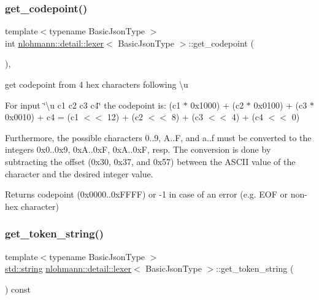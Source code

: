 \subsubsection{\texorpdfstring{get\+\_\+codepoint()}{get\_codepoint()}}
{\footnotesize\ttfamily template$<$typename Basic\+Json\+Type $>$ \\
int \mbox{\hyperlink{classnlohmann_1_1detail_1_1lexer}{nlohmann\+::detail\+::lexer}}$<$ Basic\+Json\+Type $>$\+::get\+\_\+codepoint (\begin{DoxyParamCaption}{ }\end{DoxyParamCaption})\hspace{0.3cm}{\ttfamily [inline]}, {\ttfamily [private]}}



get codepoint from 4 hex characters following {\ttfamily \textbackslash{}u} 

For input \char`\"{}\textbackslash{}u c1 c2 c3 c4\char`\"{} the codepoint is\+: (c1 $\ast$ 0x1000) + (c2 $\ast$ 0x0100) + (c3 $\ast$ 0x0010) + c4 = (c1 $<$$<$ 12) + (c2 $<$$<$ 8) + (c3 $<$$<$ 4) + (c4 $<$$<$ 0)

Furthermore, the possible characters \textquotesingle{}0\textquotesingle{}..\textquotesingle{}9\textquotesingle{}, \textquotesingle{}A\textquotesingle{}..\textquotesingle{}F\textquotesingle{}, and \textquotesingle{}a\textquotesingle{}..\textquotesingle{}f\textquotesingle{} must be converted to the integers 0x0..0x9, 0xA..0xF, 0xA..0xF, resp. The conversion is done by subtracting the offset (0x30, 0x37, and 0x57) between the A\+S\+C\+II value of the character and the desired integer value.

\begin{DoxyReturn}{Returns}
codepoint (0x0000..0x\+F\+F\+FF) or -\/1 in case of an error (e.\+g. E\+OF or non-\/hex character) 
\end{DoxyReturn}
\mbox{\label{classnlohmann_1_1detail_1_1lexer_a4aef7e72e539be04e139c34872421f2a}} 
\subsubsection{\texorpdfstring{get\+\_\+token\+\_\+string()}{get\_token\_string()}}
{\footnotesize\ttfamily template$<$typename Basic\+Json\+Type $>$ \\
\mbox{\hyperlink{namespacenlohmann_1_1detail_a1ed8fc6239da25abcaf681d30ace4985ab45cffe084dd3d20d928bee85e7b0f21}{std\+::string}} \mbox{\hyperlink{classnlohmann_1_1detail_1_1lexer}{nlohmann\+::detail\+::lexer}}$<$ Basic\+Json\+Type $>$\+::get\+\_\+token\+\_\+string (\begin{DoxyParamCaption}{ }\end{DoxyParamCaption}) const\hspace{0.3cm}{\ttfamily [inline]}}

